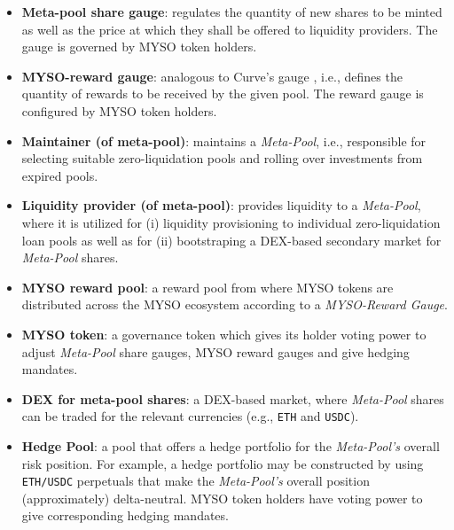 \documentclass[a4paper]{article}
\begin{document}
\begin{itemize}
    \item \textbf{Meta-pool share gauge}: regulates the quantity of new shares to be minted as well as the price at which they shall be offered to liquidity providers. The gauge is governed by MYSO token holders.
    \item \textbf{MYSO-reward gauge}: analogous to Curve's gauge \cite{curve}, i.e., defines the quantity of rewards to be received by the given pool. The reward gauge is configured by MYSO token holders.
    \item \textbf{Maintainer (of meta-pool)}: maintains a \emph{Meta-Pool}, i.e., responsible for selecting suitable zero-liquidation pools and rolling over investments from expired pools.
    \item \textbf{Liquidity provider (of meta-pool)}: provides liquidity to a \emph{Meta-Pool}, where it is utilized for (i) liquidity provisioning to individual zero-liquidation loan pools as well as for (ii) bootstraping a DEX-based secondary market for \emph{Meta-Pool} shares.
    \item \textbf{MYSO reward pool}: a reward pool from where MYSO tokens are distributed across the MYSO ecosystem according to a \emph{MYSO-Reward Gauge}.
    \item \textbf{MYSO token}: a governance token which gives its holder voting power to adjust \emph{Meta-Pool} share gauges, MYSO reward gauges and give hedging mandates.
    \item \textbf{DEX for meta-pool shares}: a DEX-based market, where \emph{Meta-Pool} shares can be traded for the relevant currencies (e.g., \verb|ETH| and \verb|USDC|). 
    \item \textbf{Hedge Pool}: a pool that offers a hedge portfolio for the \emph{Meta-Pool's} overall risk position. For example, a hedge portfolio may be constructed by using \verb|ETH/USDC| perpetuals that make the \emph{Meta-Pool's} overall position (approximately) delta-neutral. MYSO token holders have voting power to give corresponding hedging mandates.
\end{itemize}
\end{document}
